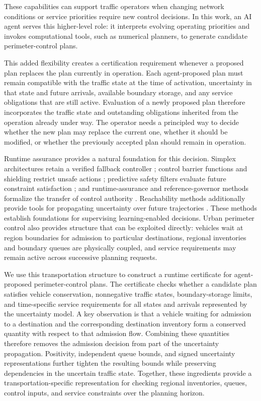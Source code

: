 \documentclass[preprint,12pt]{elsarticle}
\begin{document}
These capabilities can support traffic operators when changing network
conditions or service priorities require new control decisions. In this
work, an AI agent serves this higher-level role: it interprets evolving
operating priorities and invokes computational tools, such as numerical
planners, to generate candidate perimeter-control plans.

This added flexibility creates a certification requirement whenever a
proposed plan replaces the plan currently in operation. Each agent-proposed
plan must remain compatible with the traffic state at the time of
activation, uncertainty in that state and future arrivals, available
boundary storage, and any service obligations that are still active.
Evaluation of a newly proposed plan therefore incorporates the traffic state
and outstanding obligations inherited from the operation already under way.
The operator needs a principled way to decide whether the new plan may
replace the current one, whether it should be modified, or whether the
previously accepted plan should remain in operation.

Runtime assurance provides a natural foundation for this decision. Simplex
architectures retain a verified fallback controller
\cite{simplex,mehmood2022black}; control barrier functions and shielding
restrict unsafe actions \cite{ames2017,alshiekh2018}; predictive safety
filters evaluate future constraint satisfaction
\cite{wabersich2021,hsu2023safety}; and runtime-assurance and
reference-governor methods formalize the transfer of control authority
\cite{fisac2019,hobbs2023runtime,gilbert2002generalized,garone2017reference}.
Reachability methods additionally provide tools for propagating uncertainty
over future trajectories \cite{coogan2020mixed,kochdumper2021sparse}. These
methods establish foundations for supervising learning-enabled decisions.
Urban perimeter control also provides structure that can be exploited
directly: vehicles wait at region boundaries for admission to particular
destinations, regional inventories and boundary queues are physically
coupled, and service requirements may remain active across successive
planning requests.

We use this transportation structure to construct a runtime certificate for
agent-proposed perimeter-control plans. The certificate checks whether a
candidate plan satisfies vehicle conservation, nonnegative traffic states,
boundary-storage limits, and time-specific service requirements for all
states and arrivals represented by the uncertainty model. A key observation
is that a vehicle waiting for admission to a destination and the
corresponding destination inventory form a conserved quantity with respect
to that admission flow. Combining these quantities therefore removes the
admission decision from part of the uncertainty propagation. Positivity,
independent queue bounds, and signed uncertainty representations further
tighten the resulting bounds while preserving dependencies in the uncertain
traffic state. Together, these ingredients provide a transportation-specific
representation for checking regional inventories, queues, control inputs,
and service constraints over the planning horizon.
\end{document}
